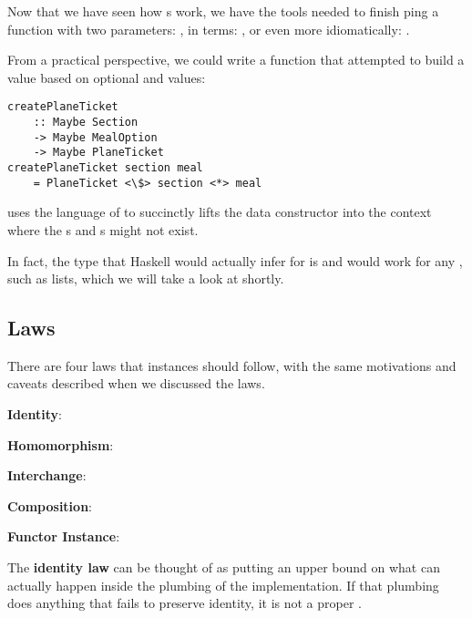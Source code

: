 Now that we have seen how s work, we have the tools needed to finish ping a function 
with two parameters: , in  terms: ,
or even more idiomatically: .

From a practical perspective, we could write a function that attempted to build a  value based on
optional  and  values:

\begin{lstlisting}
createPlaneTicket
    :: Maybe Section
    -> Maybe MealOption
    -> Maybe PlaneTicket
createPlaneTicket section meal
    = PlaneTicket <\$> section <*> meal
\end{lstlisting}

 uses the language of  to succinctly lifts the  data constructor
into the  context where the s and s might not exist.

In fact, the type that Haskell would actually infer for  is
 and would work for any , such as 
lists, which we will take a look at shortly.

\subsection{ Laws}

There are four laws that  instances should follow, with the same motivations and caveats described when
we discussed the  laws.

\begin{notelist}
    \item \textbf{Identity}: 
    \item \textbf{Homomorphism}: 
    \item \textbf{Interchange}: 
    \item \textbf{Composition}: 
    \item \textbf{Functor Instance}: 
\end{notelist}

The \textbf{identity law} can be thought of as putting an upper bound on what can actually happen inside the plumbing of
the  implementation. If that plumbing does anything that fails to preserve identity, it
is not a proper .

